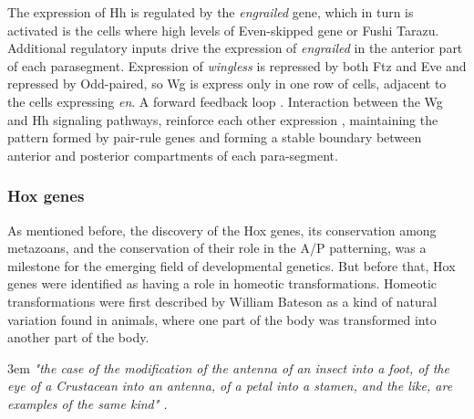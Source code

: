 The expression of Hh is regulated by the \textit{engrailed} gene, which in turn is activated is the cells where high levels of Even-skipped gene or Fushi Tarazu.
Additional regulatory inputs drive the expression of \textit{engrailed} in the anterior part of each parasegment.
Expression of \textit{wingless} is repressed by both Ftz and Eve and repressed by Odd-paired, so Wg is express only in one row of cells, adjacent to the cells expressing \textit{en}.
A forward feedback loop \citep{Chipman2015}.
Interaction between the Wg and Hh signaling pathways, reinforce each other expression \citep{Ingham1991,Heemskerk1991}, maintaining the pattern formed by pair-rule genes and forming a stable boundary between anterior and posterior compartments of each para-segment.

\subsubsection{Hox genes}
As mentioned before, the discovery of the Hox genes, its conservation among metazoans, and the conservation of their role in the A/P patterning, was a milestone for the emerging field of developmental genetics.
But before that, Hox genes were identified as having a role in homeotic transformations.
Homeotic transformations were first described by William Bateson \citep{Bateson1894} as a kind of natural variation found in animals, where one part of the body was transformed into another part of the body.
\begin{flushleft}
\leftskip3em
\rightskip\leftskip
\footnotesize{
\textit{
"the case of the modification of the antenna of an insect into a foot, of the eye of a Crustacean into an antenna, of a petal into a stamen, and the like, are examples of the same kind" \citep{Bateson1894}.
}}
\end{flushleft}


